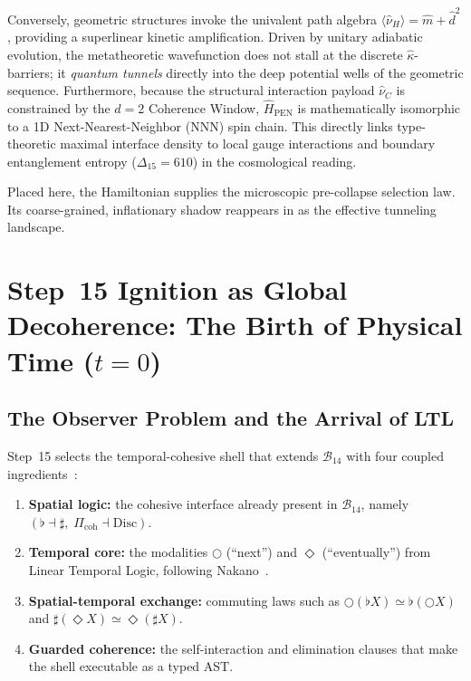 \documentclass[11pt,a4paper]{article}
\theoremstyle{plain}
\theoremstyle{definition}
\theoremstyle{remark}
\newcommand{\B}{\mathcal{B}}
\newcommand{\Disc}{\mathrm{Disc}}
\newcommand{\nextmod}{\bigcirc}
\newcommand{\eventually}{\Diamond}
\begin{document}
Conversely, geometric structures invoke the univalent path algebra $\langle \hat{\nu}_H \rangle = \hat{m} + \hat{d}^2$, providing a superlinear kinetic amplification.
Driven by unitary adiabatic evolution, the metatheoretic wavefunction does not stall at the discrete $\hat{\kappa}$-barriers; it \emph{quantum tunnels} directly into the deep potential wells of the geometric sequence.
Furthermore, because the structural interaction payload $\hat{\nu}_C$ is constrained by the $d=2$ Coherence Window, $\hat{H}_{\mathrm{PEN}}$ is mathematically isomorphic to a 1D Next-Nearest-Neighbor (NNN) spin chain.
This directly links type-theoretic maximal interface density to local gauge interactions and boundary entanglement entropy ($\Delta_{15} = 610$) in the cosmological reading.

Placed here, the Hamiltonian supplies the microscopic pre-collapse selection law.
Its coarse-grained, inflationary shadow reappears in  as the effective tunneling landscape.


\section{Step~15 Ignition as Global Decoherence: The Birth of Physical Time \texorpdfstring{($t = 0$)}{(t = 0)}}
\label{sec:ignition}

\subsection{The Observer Problem and the Arrival of LTL}
\label{sec:ltl}

Step~15 selects the temporal-cohesive shell that extends $\B_{14}$ with four coupled ingredients~\cite{pen}:

\begin{enumerate}[label=(\arabic*), nosep]
    \item \textbf{Spatial logic:} the cohesive interface already present in $\B_{14}$, namely $(\flat \dashv \sharp,\; \Pi_{\mathrm{coh}} \dashv \Disc)$.
    \item \textbf{Temporal core:} the modalities $\nextmod$ (``next'') and $\eventually$ (``eventually'') from Linear Temporal Logic, following Nakano~\cite{nakano}.
    \item \textbf{Spatial-temporal exchange:} commuting laws such as $\nextmod(\flat X) \simeq \flat(\nextmod X)$ and $\sharp(\eventually X) \simeq \eventually(\sharp X)$.
    \item \textbf{Guarded coherence:} the self-interaction and elimination clauses that make the shell executable as a typed AST.
\end{enumerate}
\end{document}
